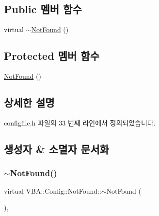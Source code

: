 \subsection*{Public 멤버 함수}
\begin{DoxyCompactItemize}
\item 
virtual \mbox{\hyperlink{class_v_b_a_1_1_config_1_1_not_found_a080694e368f76edfc9fa18621191f4f2}{$\sim$\+Not\+Found}} ()
\end{DoxyCompactItemize}
\subsection*{Protected 멤버 함수}
\begin{DoxyCompactItemize}
\item 
\mbox{\hyperlink{class_v_b_a_1_1_config_1_1_not_found_af726fdbaac59859049e6fb028c3f6d14}{Not\+Found}} ()
\end{DoxyCompactItemize}


\subsection{상세한 설명}


configfile.\+h 파일의 33 번째 라인에서 정의되었습니다.



\subsection{생성자 \& 소멸자 문서화}
\mbox{\label{class_v_b_a_1_1_config_1_1_not_found_a080694e368f76edfc9fa18621191f4f2}} 
\subsubsection{\texorpdfstring{$\sim$\+Not\+Found()}{~NotFound()}}
{\footnotesize\ttfamily virtual V\+B\+A\+::\+Config\+::\+Not\+Found\+::$\sim$\+Not\+Found (\begin{DoxyParamCaption}{ }\end{DoxyParamCaption})\hspace{0.3cm}{\ttfamily [inline]}, {\ttfamily [virtual]}}



